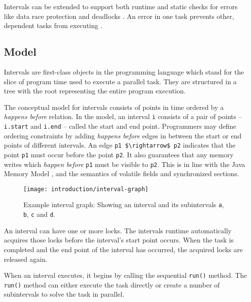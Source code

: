 Intervals can be extended to support both runtime and static checks
for errors like data race protection \cite{Matsakis2010b} and
deadlocks \cite{Matsakis2009}. An error in one task prevents other,
dependent tasks from executing \cite{Matsakis2010a}.

\subsection{Model}
\label{sec:intro-intervals-model}

Intervals are first-class objects in the programming language which
stand for the slice of program time used to execute a parallel task.
They are structured in a tree with the root representing the entire
program execution.

The conceptual model for intervals consists of points in time ordered
by a \emph{happens before} relation. In the model, an interval
\lstinline!i! consists of a pair of points -- \lstinline!i.start! and
\lstinline!i.end! -- called the start and end point. Programmers may
define ordering constraints by adding \emph{happens before} edges in
between the start or end points of different intervals. An edge
\lstinline!p1 $\rightarrow$ p2! indicates that the point
\lstinline!p1! must occur before the point \lstinline!p2!. It also
guarantees that any memory writes which \emph{happen before}
\lstinline!p1! must be visible to \lstinline!p2!. This is in line with
the Java Memory Model \cite{Manson2005}, and the semantics of volatile
fields and synchronized sections.

\begin{figure}[htb]
  \centering
  \texttt{[image: introduction/interval-graph]}
  \caption[Example interval graph]{Example interval graph: Showing an
    interval and its subintervals \lstinline!a!, \lstinline!b!,
    \lstinline!c! and \lstinline!d!.}
  \label{fig:introduction-interval-graph}
\end{figure}

An interval can have one or more locks. The intervals runtime
automatically acquires those locks before the interval's start point
occurs. When the task is completed and the end point of the interval
has occurred, the acquired locks are released again.

When an interval executes, it begins by calling the sequential
\lstinline!run()! method. The \lstinline!run()! method can either
execute the task directly or create a number of subintervals to solve
the task in parallel.

